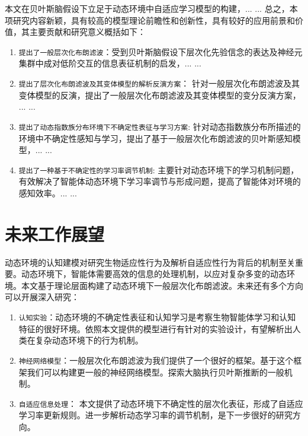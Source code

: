 本文在贝叶斯脑假设下立足于动态环境中自适应学习模型的构建，... ... 总之，本项研究内容新颖，具有较高的模型理论前瞻性和创新性，具有较好的应用前景和价值，其主要贡献和研究意义概括如下：
\begin{enumerate}
	\item {\verb|提出了一般层次化布朗滤波|}：受到贝叶斯脑假设下层次化先验信念的表达及神经元集群中成对低阶交互的信息表征机制的启发，... ...
	
	\item {\verb|提出了层次化布朗滤波及其变体模型的解析反演方案|}： 针对一般层次化布朗滤波及其变体模型的反演，提出了一般层次化布朗滤波及其变体模型的变分反演方案， ... ...
	
	\item {\verb|提出了动态指数族分布环境下不确定性表征与学习方案|}: 针对动态指数族分布所描述的环境中不确定性感知与学习，提出了基于一般层次化布朗滤波的贝叶斯感知模型，... ...
	
	\item {\verb|提出了一种基于不确定性的学习率调节机制|}: 主要针对动态环境下的学习机制问题，有效解决了智能体动态环境下学习率调节与形成问题，提高了智能体对环境的感知效率。... ...

\end{enumerate}

\section{未来工作展望}
动态环境的认知建模对研究生物适应性行为及解析自适应性行为背后的机制至关重要。动态环境下，智能体需要高效的信息的处理机制，以应对复杂多变的动态环境。本文基于理论层面构建了动态环境下一般层次化布朗滤波。未来还有多个方向可以开展深入研究：
\begin{enumerate}
	\item {\verb|认知实验|}：动态环境的不确定性表征和认知学习是考察生物智能体学习和认知特征的很好环境。依照本文提供的模型进行有针对的实验设计，有望解析出人类在复杂动态环境下的行为机制。
	\item {\verb|神经网络模型|}：一般层次化布朗滤波为我们提供了一个很好的框架。基于这个框架我们可以构建更一般的神经网络模型。探索大脑执行贝叶斯推断的一般机制。
	\item {\verb|自适应信息处理|}： 本文提供了动态环境下不确定性的层次化表征，形成了自适应学习率更新规则。进一步解析动态学习率的调节机制，是下一步很好的研究方向。
\end{enumerate}